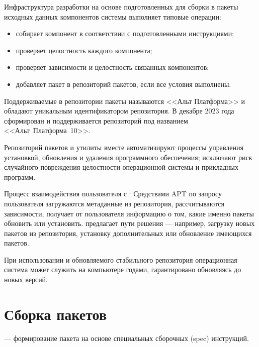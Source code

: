 Инфраструктура разработки  на основе подготовленных для сборки в пакеты исходных данных компонентов
системы выполняет типовые операции:
\begin{itemize}
	\item собирает компонент в соответствии с подготовленными инструкциями;
	\item проверяет целостность каждого компонента;
	\item проверяет зависимости и целостность связанных компонентов;
	\item добавляет пакет в репозиторий пакетов, если все условия выполнены.
\end{itemize}

Поддерживаемые в  репозитории пакеты называются <<Альт Платформа>> и обладают уникальным идентификатором
репозитория. В декабре 2023 года сформирован и поддерживается репозиторий  под названием <<Альт~Платформа~10>>.

Репозиторий пакетов и утилиты  вместе автоматизируют процессы управления установкой, обновления и удаления
программного обеспечения; исключают риск случайного повреждения целостности операционной системы и прикладных 
программ.

Процесс взаимодействия пользователя с : Средствами APT по запросу пользователя загружаются метаданные
из репозитория, рассчитываются зависимости,  получает от пользователя информацию о том,
какие именно пакеты обновить или установить.  предлагает пути решения --- например, загрузку
новых пакетов из репозитория, установку дополнительных или обновление имеющихся пакетов.


При использовании  и обновляемого стабильного репозитория операционная система может 
служить на компьютере годами, гарантировано обновляясь до новых версий.

\hypertarget{1.3}{\section{Сборка пакетов}}
 --- формирование пакета на основе специальных сборочных (spec) инструкций.

